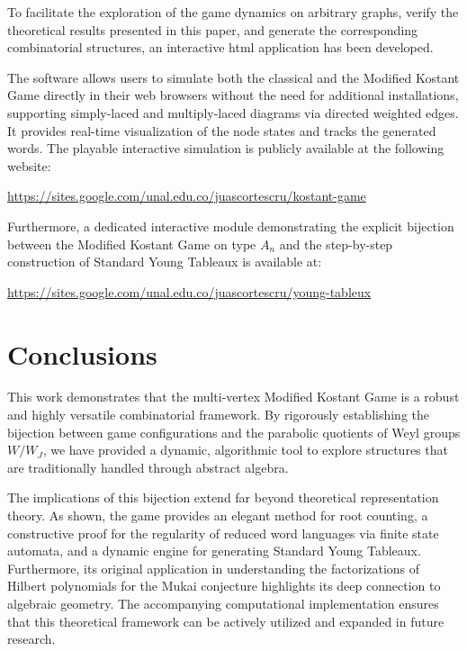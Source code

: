 \documentclass[11pt,a4paper]{amsart}
\theoremstyle{plain}
\theoremstyle{definition}
\theoremstyle{remark}
\begin{document}
To facilitate the exploration of the game dynamics on arbitrary graphs, verify the theoretical results presented in this paper, and generate the corresponding combinatorial structures, an interactive html application has been developed. 

The software allows users to simulate both the classical and the Modified Kostant Game directly in their web browsers without the need for additional installations, supporting simply-laced and multiply-laced diagrams via directed weighted edges. It provides real-time visualization of the node states and tracks the generated words. The playable interactive simulation is publicly available at the following website:
\begin{center}
    \url{https://sites.google.com/unal.edu.co/juascortescru/kostant-game}
\end{center}

\noindent Furthermore, a dedicated interactive module demonstrating the explicit bijection between the Modified Kostant Game on type $A_n$ and the step-by-step construction of Standard Young Tableaux is available at:
\begin{center}
    \url{https://sites.google.com/unal.edu.co/juascortescru/young-tableux}
\end{center}


\section{Conclusions}
\label{sec:conclusions}

This work demonstrates that the multi-vertex Modified Kostant Game is a robust and highly versatile combinatorial framework. By rigorously establishing the bijection between game configurations and the parabolic quotients of Weyl groups $W/W_J$, we have provided a dynamic, algorithmic tool to explore structures that are traditionally handled through abstract algebra.

The implications of this bijection extend far beyond theoretical representation theory. As shown, the game provides an elegant method for root counting, a constructive proof for the regularity of reduced word languages via finite state automata, and a dynamic engine for generating Standard Young Tableaux. Furthermore, its original application in understanding the factorizations of Hilbert polynomials for the Mukai conjecture highlights its deep connection to algebraic geometry. The accompanying computational implementation ensures that this theoretical framework can be actively utilized and expanded in future research.
\end{document}
